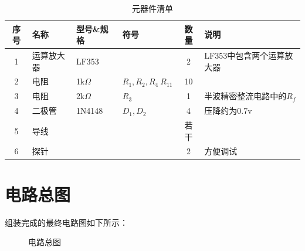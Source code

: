 \documentclass[UTF8,titlepage,a4paper]{ctexart}
\numberwithin{figure}{section}
\begin{document}
\begin{table}[h]
    \centering
    \begin{tabularx}{\textwidth}{|c|X|X|X|c|X|}
    \hline
    \textbf{序号} & \textbf{名称} & \textbf{型号\&规格}  & \textbf{符号} & \textbf{数量} & \textbf{说明} \\
    \hline
    1 & 运算放大器 & LF353 & & 2 & LF353中包含两个运算放大器 \\
    \hline
    2 & 电阻 & 1k$\Omega$ &$R_1,R_2,R_4~R_11$ & 10 &  \\
    \hline
    3 & 电阻 & 2k$\Omega$ &$R_3$& 1 & 半波精密整流电路中的$R_f$ \\
    \hline
    4 & 二极管 & 1N4148 &$D_1,D_2$& 4 & 压降约为0.7v \\
    \hline
    5 & 导线 &  & & 若干 &  \\
    \hline
    6 & 探针 &  & & 2 & 方便调试 \\
    \hline
    \end{tabularx}
    \caption{元器件清单}
    \end{table}

\section{电路总图}
组装完成的最终电路图如下所示：
\begin{figure}[H]
\centering
 \caption{电路总图}
 \label{}
\end{figure}

\clearpage
\end{document}
